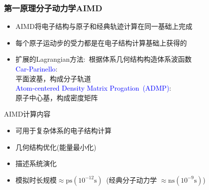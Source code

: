 \frame
{
	\frametitle{第一原理分子动力学\textrm{AIMD}}
	\begin{itemize}
		\item \textrm{AIMD}将电子结构与原子和经典轨迹计算在同一基础上完成
		\item 每个原子运动步的受力都是在电子结构计算基础上获得的
		\item 扩展的\textrm{Lagrangian}方法:~根据体系几何结构构造体系波函数\\
			\textcolor{blue}{\textrm{Car-Parinello}}:\\
			平面波基，构成分子轨道\\
			\textcolor{blue}{\textrm{Atom-centered Density Matrix Progation~(ADMP)}}:\\
			原子中心基，构成密度矩阵
	\end{itemize}
	\textrm{AIMD}计算内容
	\begin{itemize}
		\item 可用于复杂体系的电子结构计算
		\item 几何结构优化(能量最小化)
		\item 描述系统演化
		\item 模拟时长规模$\approx{\mathrm{ps}}(10^{-12}\mathrm{s})$~(经典分子动力学 $\approx\mathrm{ns}(10^{-9}\mathrm{s})$)
	\end{itemize}
}


